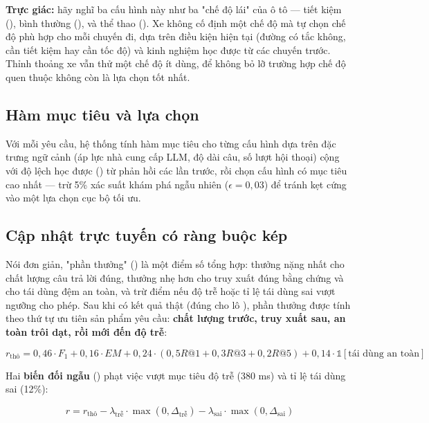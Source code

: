 \textbf{Trực giác:} hãy nghĩ ba cấu hình này như ba "chế độ lái" của ô tô — tiết kiệm
(), bình thường (), và thể thao (). Xe không cố định một
chế độ mà tự chọn chế độ phù hợp cho mỗi chuyến đi, dựa trên điều kiện hiện tại (đường có
tắc không, cần tiết kiệm hay cần tốc độ) và kinh nghiệm học được từ các chuyến trước.
Thỉnh thoảng xe vẫn thử một chế độ ít dùng, để không bỏ lỡ trường hợp chế độ quen thuộc
không còn là lựa chọn tốt nhất.

\subsection{Hàm mục tiêu và lựa chọn}

Với mỗi yêu cầu, hệ thống tính hàm mục tiêu cho từng cấu hình dựa trên đặc trưng ngữ cảnh
(áp lực nhà cung cấp LLM, độ dài câu, số lượt hội thoại) cộng với độ lệch học được
() từ phản hồi các lần trước, rồi chọn cấu hình có mục tiêu cao nhất — trừ
5\% xác suất khám phá ngẫu nhiên (\(\epsilon = 0{,}03\)) để tránh kẹt cứng vào một lựa
chọn cục bộ tối ưu.

\subsection{Cập nhật trực tuyến có ràng buộc kép}

Nói đơn giản, "phần thưởng" () là một điểm số tổng hợp: thưởng nặng nhất cho
chất lượng câu trả lời đúng, thưởng nhẹ hơn cho truy xuất đúng bằng chứng và cho tái dùng
đệm an toàn, và trừ điểm nếu độ trễ hoặc tỉ lệ tái dùng sai vượt ngưỡng cho phép. Sau khi có
kết quả thật (đúng cho lô ), phần thưởng được tính theo thứ tự ưu tiên sản
phẩm yêu cầu: \textbf{chất lượng trước, truy xuất sau, an toàn trôi dạt, rồi mới đến độ trễ}:

\begin{equation}
r_{\text{thô}} = 0{,}46\cdot F_1 + 0{,}16\cdot EM + 0{,}24\cdot(0{,}5R@1{+}0{,}3R@3{+}0{,}2R@5) + 0{,}14\cdot\mathbb{1}[\text{tái dùng an toàn}]
\end{equation}

Hai \textbf{biến đối ngẫu} () phạt việc vượt mục tiêu độ trễ
(380 ms) và tỉ lệ tái dùng sai (12\%):

\begin{equation}
r = r_{\text{thô}} - \lambda_{\text{trễ}}\cdot\max(0, \Delta_{\text{trễ}}) - \lambda_{\text{sai}}\cdot\max(0, \Delta_{\text{sai}})
\end{equation}

